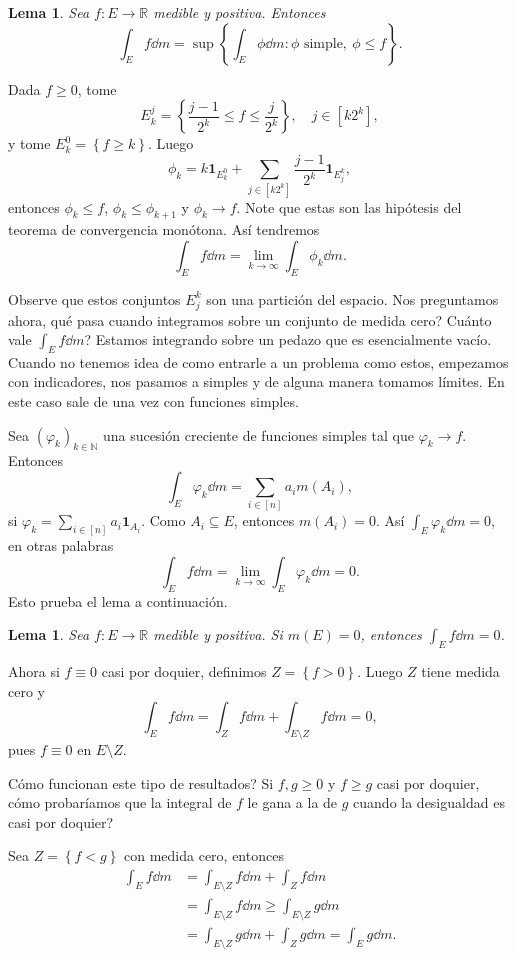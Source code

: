 \documentclass[12pt]{article}
\theoremstyle{plain}
\newtheorem{Lem}[Th]{Lema}             %
\theoremstyle{definition}
\theoremstyle{remark}
\numberwithin{equation}{section}
\newcommand{\bN}{\mathbb{N}}        %
\newcommand{\bR}{\mathbb{R}}        %
\newcommand{\ind}{\mathbf{1}}       %
\renewcommand{\geq}{\geqslant}      %
\renewcommand{\leq}{\leqslant}      %
\renewcommand{\:}{\colon}           %
\newcommand{\conj}[1]{\left\lbrace#1\right\rbrace}
\newcommand{\bonj}[1]{\left\lbrack#1\right\rbrack}
\begin{document}
\begin{multicols}{2}
\begin{Lem}
  Sea $f\: E\to\bR$ medible y positiva. Entonces
  $$\int_Ef\dd m=\sup\conj{\int_E\phi\dd m\: \phi\text{ simple},\ \phi\leq f}.$$
\end{Lem}

\begin{ptcbp}
Dada $f\geq 0$, tome
$$E_k^j=\conj{\frac{j-1}{2^k}\leq f\leq\frac{j}{2^k}},\quad j\in\bonj{k2^k},$$
y tome $E_k^0=\conj{f\geq k}$. Luego
$$\phi_k=k\ind_{E_k^0}+\sum_{j\in\bonj{k2^k}}\frac{j-1}{2^k}\ind_{E_j^k},$$
entonces $\phi_k\leq f$, $\phi_k\leq \phi_{k+1}$ y $\phi_k\to f$. Note que estas son las hipótesis del teorema de convergencia monótona. Así tendremos
$$\int_Ef\dd m=\lim_{k\to\infty}\int_E\phi_k\dd m.$$
\end{ptcbp}

Observe que estos conjuntos $E_j^k$ son una partición del espacio. Nos preguntamos ahora, qué pasa cuando integramos sobre un conjunto de medida cero? Cuánto vale $\int_Ef\dd m$? Estamos integrando sobre un pedazo que es esencialmente vacío. Cuando no tenemos idea de como entrarle a un problema como estos, empezamos con indicadores, nos pasamos a simples y de alguna manera tomamos límites. En este caso sale de una vez con funciones simples.\par
Sea $(\varphi_k)_{k\in\bN}$ una sucesión creciente de funciones simples tal que $\varphi_k\to f$. Entonces
$$\int_E\varphi_k\dd m=\sum_{i\in\bonj{n}}a_im(A_i),$$
si $\varphi_k=\sum_{i\in\bonj{n}}a_i\ind_{A_i}$. Como $A_i\subseteq E$, entonces $m(A_i)=0$. Así $\int_E\varphi_k\dd m=0$, en otras palabras
$$\int_Ef\dd m=\lim_{k\to\infty}\int_E\varphi_k\dd m=0.$$
Esto prueba el lema a continuación.
\begin{Lem}\label{lem:conjMedCeroImpliesIntCero}
  Sea $f\:E\to\bR$ medible y positiva. Si $m(E)=0$, entonces $\int_Ef\dd m=0$.
\end{Lem}

Ahora si $f\equiv 0$ casi por doquier, definimos $Z=\conj{f>0}$. Luego $Z$ tiene medida cero y
$$\int_Ef\dd m=\int_Z f\dd m+\int_{E\setminus Z}f\dd m=0,$$
pues $f\equiv 0$ en $E\setminus Z$.\par
Cómo funcionan este tipo de resultados? Si $f,g\geq 0$ y $f\geq g$ casi por doquier, cómo probaríamos que la integral de $f$ le gana a la de $g$ cuando la desigualdad es casi por doquier?\par
Sea $Z=\conj{f<g}$ con medida cero, entonces
\begin{align*}
  \int_Ef\dd m & =\int_{E\setminus Z}f\dd m+\int_Zf\dd m\\
  &=\int_{E\setminus Z}f\dd m\geq \int_{E\setminus Z}g\dd m\\
  &=\int_{E\setminus Z}g\dd m+\int_Z g\dd m=\int_{E}g\dd m.
\end{align*}


\end{multicols}
\end{document}
